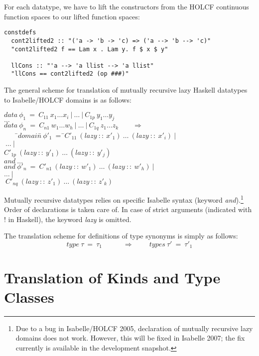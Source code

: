 \documentclass{llncs}
\begin{document}
For each datatype, we have to lift the constructors from the
HOLCF continuous function spaces to our lifted function spaces:

\begin{verbatim}
constdefs
  cont2lifted2 :: "('a -> 'b -> 'c) => ('a --> 'b --> 'c)"
  "cont2lifted2 f == Lam x . Lam y. f $ x $ y"

  llCons :: "'a --> 'a llist --> 'a llist"
  "llCons == cont2lifted2 (op ###)"
\end{verbatim}



The general scheme for translation of mutually recursive lazy Haskell
datatypes to Isabelle/HOLCF domains is as follows:
\begin{tabbing}
$ data \ \phi_1 \ = \ C_{11} \ x_1 \ldots x_i
  \ | \ \ldots \ | \ C_{1p} \ y_1 \ldots y_j $ \\
$ \ldots $ \\
$ data \ \phi_n \ = \ C_{n1} \ w_1 \ldots w_h
  \ | \ \ldots \ | \ C_{1q} \ z_1 \ldots z_k \qquad \Longrightarrow $ \\
$  \qquad $\=$ domain$\=$ \ \phi'_1 \ = \  $\=$ C'_{11} \ (lazy~ ::\ x'_1) \ \ldots \ (lazy~ :: \ 
  x'_i) \ |$\\
\>\>\>$ \ \ldots \ | \ $\\
\>\>\>$ C'_{1p} \ 
  (lazy~ :: \ y'_1) \ \ldots \ (lazy~ :: \ y'_j) $\\
\>$  and \ \ldots $\\
\>$  and \ $\>$\phi'_n \ = \ C'_{n1} \ (lazy~ :: \ w'_1) \ \ldots \ (lazy~ :: \ 
  w'_h) \ | \ $\\
\>\>\>$\ldots \ | $\\
\>\>\>$\  C'_{nq} \ 
  (lazy~ :: \ z'_1) \ \ldots \ (lazy~ :: \ z'_k) $\\
\end{tabbing}
Mutually recursive datatypes relies on specific Isabelle syntax
(keyword \emph{and}).\footnote {Due to a bug in Isabelle/HOLCF 2005,
  declaration of mutually recursive lazy domains does not work.
  However, this will be fixed in Isabelle 2007; the fix currently is
  available in the development snapshot.} Order of declarations is
taken care of. In case of strict arguments (indicated with ! in
Haskell), the keyword \emph{lazy} is omitted.

The translation scheme for definitions of type synonyms is simply as follows:
$$  type \ \tau \ = \ \tau_1 \quad \qquad \Longrightarrow \qquad
  \ types \ \tau' \ = \ \tau'_1 
$$


\section{Translation of Kinds and Type Classes}
\end{document}
